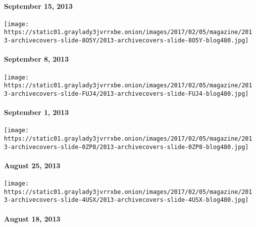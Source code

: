 \hypertarget{september-15-2013}{%
\paragraph{September 15, 2013}\label{september-15-2013}}

\href{http://www.nytimes3xbfgragh.onion/indexes/2013/09/08/magazine/index.html}{}

\texttt{[image: https://static01.graylady3jvrrxbe.onion/images/2017/02/05/magazine/2013-archivecovers-slide-8O5Y/2013-archivecovers-slide-8O5Y-blog480.jpg]}

\hypertarget{september-8-2013}{%
\paragraph{September 8, 2013}\label{september-8-2013}}

\href{http://www.nytimes3xbfgragh.onion/indexes/2013/09/01/magazine/index.html}{}

\texttt{[image: https://static01.graylady3jvrrxbe.onion/images/2017/02/05/magazine/2013-archivecovers-slide-FUJ4/2013-archivecovers-slide-FUJ4-blog480.jpg]}

\hypertarget{september-1-2013}{%
\paragraph{September 1, 2013}\label{september-1-2013}}

\href{http://www.nytimes3xbfgragh.onion/indexes/2013/08/25/magazine/index.html}{}

\texttt{[image: https://static01.graylady3jvrrxbe.onion/images/2017/02/05/magazine/2013-archivecovers-slide-0ZP8/2013-archivecovers-slide-0ZP8-blog480.jpg]}

\hypertarget{august-25-2013}{%
\paragraph{August 25, 2013}\label{august-25-2013}}

\href{http://www.nytimes3xbfgragh.onion/indexes/2013/08/18/magazine/index.html}{}

\texttt{[image: https://static01.graylady3jvrrxbe.onion/images/2017/02/05/magazine/2013-archivecovers-slide-4USX/2013-archivecovers-slide-4USX-blog480.jpg]}

\hypertarget{august-18-2013}{%
\paragraph{August 18, 2013}\label{august-18-2013}}

